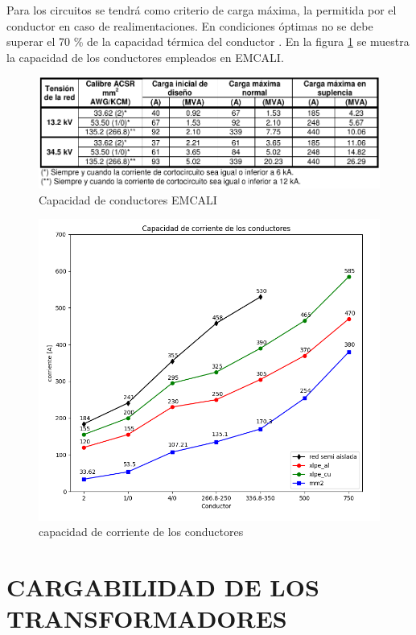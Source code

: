 \documentclass[a5paper]{book}%
\begin{document}
Para los circuitos se tendrá como criterio de carga máxima, la
permitida por el conductor en caso de realimentaciones. En condiciones
óptimas  no se debe superar el 70 \% de la capacidad térmica del
conductor \cite{MANOPEMCALI}. En la figura \ref{fig:capacidad_conductores_emcali} se
muestra la capacidad de los conductores empleados en EMCALI.

\begin{figure}[H]
  \centering
  \caption{Capacidad de conductores EMCALI}
  \label{fig:capacidad_conductores_emcali}
  \includegraphics[width=\linewidth]{aereos_emcali}
\end{figure}

\begin{figure}[H]
  \centering
  
  \caption{capacidad de corriente de los conductores}
  \label{fig:ampacidad}
  \includegraphics[width=\linewidth]{capacidad_corriete}
\end{figure}


\section{CARGABILIDAD DE LOS TRANSFORMADORES}
\end{document}
